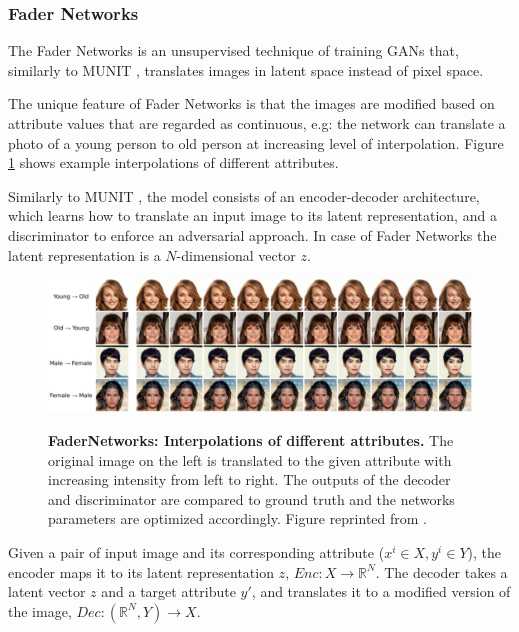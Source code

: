 \documentclass{article}
\begin{document}
\pagebreak
\subsubsection{Fader Networks}
The Fader Networks \cite{lample_fader_2017} is an unsupervised technique of training GANs that, similarly to MUNIT \cite{huang_multimodal_2018}, translates images in latent space instead of pixel space. 

The unique feature of Fader Networks is that the images are modified based on attribute values that are regarded as continuous, e.g: the network can translate a photo of a young person to old person at increasing level of interpolation. Figure \ref{fig:fader_ex} shows example interpolations of different attributes.

Similarly to MUNIT \cite{huang_multimodal_2018}, the model consists of an encoder-decoder architecture, which learns how to translate an input image to its latent representation, and a discriminator to enforce an adversarial approach. In case of Fader Networks the latent representation is a $N$-dimensional vector $z$.

\begin{figure}[h]
\centering
{\includegraphics[width=\linewidth]{GAN/fader_example}}
\caption{\label{fig:fader_ex} \textbf{FaderNetworks: Interpolations of different attributes.} The original image on the left is translated to the given attribute with increasing intensity from left to right. The outputs of the decoder and discriminator are compared to ground truth and the networks parameters are optimized accordingly. Figure reprinted from \cite{lample_fader_2017}.}
\end{figure}


Given a pair of input image and its corresponding attribute ($x^i \in X, y^i \in Y$), the encoder maps it to its latent representation $z$, $Enc: X \rightarrow \mathbb{R}^N$. The decoder takes a latent vector $z$ and a target attribute $y'$, and translates it to a modified version of the image, $Dec: (\mathbb{R}^N, Y) \rightarrow X$.
\end{document}
